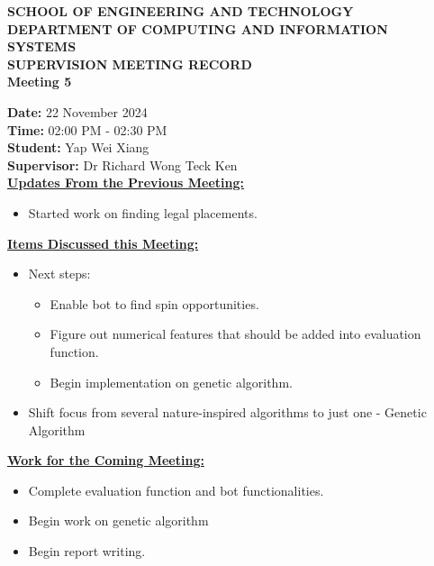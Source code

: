 \documentclass[a4paper, 12pt]{report}
\begin{document}
	
	\onehalfspacing
	
	\begin{center}
		
		\textbf{\large SCHOOL OF ENGINEERING AND TECHNOLOGY}	\\
		\textbf{\small DEPARTMENT OF COMPUTING AND INFORMATION SYSTEMS} \\
		\vspace{1cm}
		\textbf{\LARGE SUPERVISION MEETING RECORD}\\
		\textbf{\normalsize Meeting 5}	%
		
	\end{center}
	
	\noindent			%
	\textbf{Date: } 22 November 2024 \\	%
	\textbf{Time: } 02:00 PM - 02:30 PM \\	%
	\textbf{Student: } Yap Wei Xiang \\
	\textbf{Supervisor: } Dr Richard Wong Teck Ken \\
	
	\noindent			%
	\textbf{\underline{Updates From the Previous Meeting: }}
	\begin{itemize}	%
		\item Started work on finding legal placements.
	\end{itemize}
	
	\noindent			%
	\textbf{\underline{Items Discussed this Meeting: }}
	\begin{itemize}	%
		\item Next steps:
		\begin{itemize}
			\item Enable bot to find spin opportunities.
			\item Figure out numerical features that should be added into evaluation function.
			\item Begin implementation on genetic algorithm.
		\end{itemize}
		\item Shift focus from several nature-inspired algorithms to just one - Genetic Algorithm
	\end{itemize}
	
	\noindent			%
	\textbf{\underline{Work for the Coming Meeting: }}
	\begin{itemize}	%
		\item Complete evaluation function and bot functionalities.
		\item Begin work on genetic algorithm
		\item Begin report writing.
	\end{itemize}
	
\end{document}
